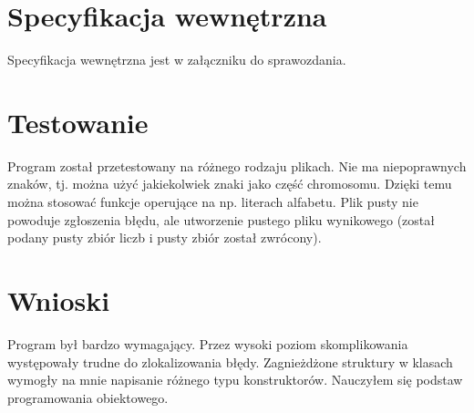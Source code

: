 \documentclass[12pt,a4paper]{article}
\begin{document}
\section{Specyfikacja wewnętrzna}\label{sec:sp-wew}
Specyfikacja wewnętrzna jest w załączniku do sprawozdania.

\section{Testowanie}
Program został przetestowany na różnego rodzaju plikach. Nie ma niepoprawnych znaków, tj. można użyć jakiekolwiek znaki jako część chromosomu. Dzięki temu można stosować funkcje operujące na np. literach alfabetu. Plik pusty nie powoduje zgłoszenia błędu, ale utworzenie pustego pliku wynikowego (został podany pusty zbiór liczb i pusty zbiór został zwrócony).

\section{Wnioski}
Program był bardzo wymagający. Przez wysoki poziom skomplikowania występowały trudne do zlokalizowania błędy.
Zagnieżdżone struktury w klasach wymogły na mnie napisanie różnego typu konstruktorów. Nauczyłem się podstaw programowania obiektowego.
\end{document}
